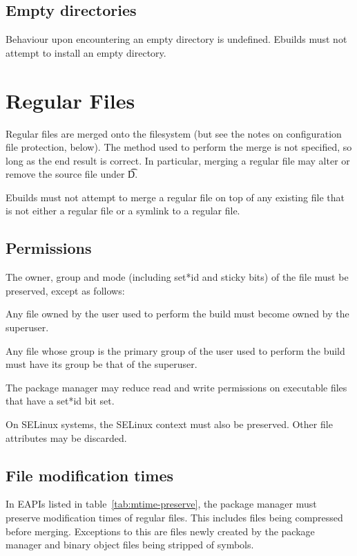 \subsection{Empty directories}

Behaviour upon encountering an empty directory is undefined. Ebuilds must not attempt to install an
empty directory.

\section{Regular Files}

Regular files are merged onto the filesystem (but see the notes on configuration file protection,
below). The method used to perform the merge is not specified, so long as the end result is correct.
In particular, merging a regular file may alter or remove the source file under \t{D}.

Ebuilds must not attempt to merge a regular file on top of any existing file that is not either a
regular file or a symlink to a regular file.

\subsection{Permissions}

The owner, group and mode (including set*id and sticky bits) of the file must be preserved, except
as follows:

\begin{compactitem}
\item Any file owned by the user used to perform the build must become owned by the superuser.
\item Any file whose group is the primary group of the user used to perform the build must have
    its group be that of the superuser.
\item The package manager may reduce read and write permissions on executable files that have a
    set*id bit set.
\end{compactitem}

On SELinux systems, the SELinux context must also be preserved. Other
file attributes may be discarded.

\subsection{File modification times}

In EAPIs listed in table~\ref{tab:mtime-preserve}, the package manager
must preserve modification times of regular files. This includes files
being compressed before merging. Exceptions to this are files newly
created by the package manager and binary object files being stripped
of symbols.


